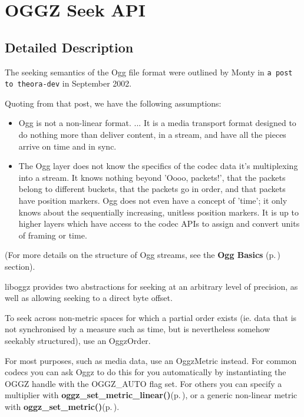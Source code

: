 \section{OGGZ Seek API}
\label{group__seeking__group}


\subsection{Detailed Description}
The seeking semantics of the Ogg file format were outlined by Monty in {\tt a post to theora-dev} in September 2002. 

Quoting from that post, we have the following assumptions:

\begin{itemize}
\item Ogg is not a non-linear format. ... It is a media transport format designed to do nothing more than deliver content, in a stream, and have all the pieces arrive on time and in sync.\item The Ogg layer does not know the specifics of the codec data it's multiplexing into a stream. It knows nothing beyond 'Oooo, packets!', that the packets belong to different buckets, that the packets go in order, and that packets have position markers. Ogg does not even have a concept of 'time'; it only knows about the sequentially increasing, unitless position markers. It is up to higher layers which have access to the codec APIs to assign and convert units of framing or time.\end{itemize}


(For more details on the structure of Ogg streams, see the {\bf Ogg Basics }{\rm (p.\,\pageref{group__basics})} section).

liboggz provides two abstractions for seeking at an arbitrary level of precision, as well as allowing seeking to a direct byte offset.

To seek across non-metric spaces for which a partial order exists (ie. data that is not synchronised by a measure such as time, but is nevertheless somehow seekably structured), use an Oggz\-Order.

For most purposes, such as media data, use an Oggz\-Metric instead. For common codecs you can ask Oggz to do this for you automatically by instantiating the OGGZ handle with the OGGZ\_\-AUTO flag set. For others you can specify a multiplier with {\bf oggz\_\-set\_\-metric\_\-linear()}{\rm (p.\,\pageref{group__seeking__group_a1})}, or a generic non-linear metric with {\bf oggz\_\-set\_\-metric()}{\rm (p.\,\pageref{group__seeking__group_a2})}.

